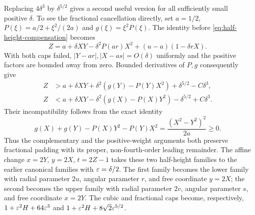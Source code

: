 Replacing $4\delta^3$ by $\delta^{5/2}$ gives a second useful
version for all sufficiently small positive $\delta$. To see the fractional cancellation directly, set $a=1/2$,
$P(\xi)=a/2+\xi^2/(2a)$ and $g(\xi)=\xi^2P(\xi)$.
The identity before \eqref{eq:half-height-compensation} becomes
\[
 Z=a+\delta XY-\delta^2P(ar)X^2
       +(u-a)(1-\delta rX).
\]
With both caps failed, $|Y-ar|,|X-as|=O(\delta)$ uniformly and the
positive factors are bounded away from zero. Bounded derivatives of
$P,g$ consequently give
\begin{align*}
 Z&>a+\delta XY+\delta^2(g(Y)-P(Y)X^2)
       +\delta^{5/2}-C\delta^3,\\
 Z&<a+\delta XY-\delta^2(g(X)-P(X)Y^2)
       -\delta^{5/2}+C\delta^3.
\end{align*}
Their incompatibility follows from the exact identity
\[
 g(X)+g(Y)-P(X)Y^2-P(Y)X^2
 =\frac{(X^2-Y^2)^2}{2a}\ge0.
\]
Thus the complementary and the positive-weight arguments both preserve
fractional padding with its proper, non-fourth-order leading remainder.
The affine change $x=2Y$, $y=2X$, $t=2Z-1$ takes these two
half-height families to the earlier canonical families with
$\varepsilon=\delta/2$. The first family becomes the lower family with
radial parameter $2u$, angular parameter $r$, and free coordinate $y=2X$;
the second becomes the upper family with radial parameter $2v$, angular
parameter $s$, and free coordinate $x=2Y$. The cubic and fractional caps become, respectively,
$1+\varepsilon^2H+64\varepsilon^3$ and
$1+\varepsilon^2H+8\sqrt2\varepsilon^{5/2}$.
